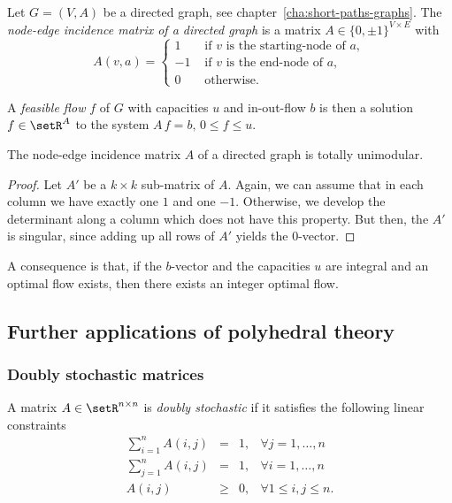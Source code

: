 Let $G=(V,A)$ be a directed graph, see
chapter~\ref{cha:short-paths-graphs}.
The \emph{node-edge incidence matrix of a directed graph}
is a matrix $A \in \{0,\pm1\}^{V\times E}$ with 
\begin{equation}
  \label{po:eq:8}
  A(v,a) = 
  \begin{cases}
    1 & \text{ if } v \text{ is the starting-node of } a, \\
    -1 & \text{ if } v \text{ is the end-node of } a, \\
    0  & \text{ otherwise.}
  \end{cases}
\end{equation}


A \emph{feasible flow} $f$  of $G$ with capacities $u$ and in-out-flow $b$ is then
a solution $f \in \setR^A$ to the system $A\,f=b, \, 0\leq f\leq u$.  

\begin{lemma}
  \label{po:lem:10}
  The node-edge incidence matrix $A$ of a directed graph  is totally
  unimodular.  
\end{lemma}


\begin{proof}
  Let $A'$ be a $k\times k$ sub-matrix of $A$. Again, we can assume that in
  each column we have exactly one $1$ and one $-1$. Otherwise, we
  develop the determinant along a column which does not have this
  property.  But then, the $A'$ is singular, since adding up all rows
  of $A'$ yields the $0$-vector. 
\end{proof}
  

A consequence is that, if the $b$-vector and the capacities $u$ are
integral and an optimal flow exists, then there exists an integer
optimal flow. 




\subsection{Further applications of polyhedral theory}
\label{po:sec:furth-appl-polyh}


\subsubsection{Doubly stochastic matrices}


A matrix $A \in \setR^{n\times n}$ is \emph{doubly stochastic} if it satisfies
the following linear constraints 
\begin{equation}
  \label{po:eq:9}
  \begin{array}{rcll}
    \sum_{i=1}^n A(i,j) & = & 1, & \forall j=1,\ldots,n\\
    \sum_{j=1}^n A(i,j) & = & 1, & \forall i=1,\ldots,n\\
    A(i,j)       & \geq & 0, & \forall 1 \leq i,j\leq n.
  \end{array}
\end{equation}

